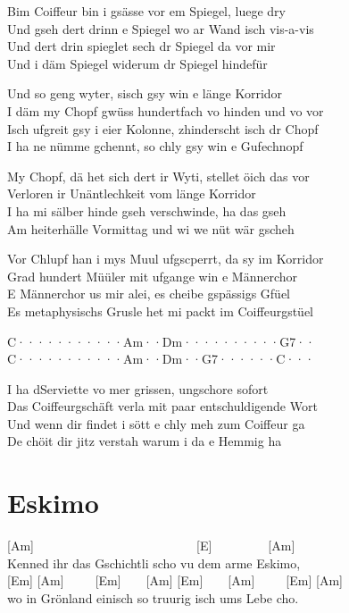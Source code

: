 \documentclass[
  letterpaper,
]{scrbook}
\begin{document}
Bim Coiffeur bin i gsässe vor em Spiegel, luege dry\\
Und gseh dert drinn e Spiegel wo ar Wand isch vis-a-vis\\
Und dert drin spieglet sech dr Spiegel da vor mir\\
Und i däm Spiegel widerum dr Spiegel hindefür

Und so geng wyter, s\textquotesingle isch gsy win e länge Korridor\\
I däm my Chopf gwüss hundertfach vo hinden und vo vor\\
Isch ufgreit gsy i eier Kolonne, z\textquotesingle hinderscht isch dr
Chopf\\
I ha ne nümme gchennt, so chly gsy win e Gufechnopf

My Chopf, dä het sich dert ir Wyti, stellet öich das vor\\
Verloren ir Unäntlechkeit vom länge Korridor\\
I ha mi sälber hinde gseh verschwinde, ha das gseh\\
Am heiterhälle Vormittag und wi we nüt wär gscheh

Vor Chlupf han i mys Muul ufgscperrt, da sy im Korridor\\
Grad hundert Müüler mit ufgange win e Männerchor\\
E Männerchor us mir alei, es cheibe gspässigs Gfüel\\
Es metaphysischs Grusle het mi packt im Coiffeurgstüel

\textbar C·······\textbar····Am··\textbar Dm······\textbar····G7··\textbar{}\\
\textbar C·······\textbar····Am··\textbar Dm··G7··\textbar····C···\textbar{}

I ha d\textquotesingle Serviette vo mer grissen, ungschore sofort\\
Das Coiffeurgschäft verla mit paar entschuldigende Wort\\
Und wenn dir findet i sött e chly meh zum Coiffeur ga\\
De chöit dir jitz verstah warum i da e Hemmig ha

\hypertarget{eskimo}{%
\chapter{Eskimo}\label{eskimo}}

{[}Am{]}~~~~~~~~~~~~~~~~~~~~~~~~~~{[}E{]}~~~~~~~~~{[}Am{]}\\
Kenned ihr das Gschichtli scho vu dem arme Eskimo,\\
{[}Em{]} {[}Am{]}~~~~~{[}Em{]}~~~~{[}Am{]}
{[}Em{]}~~~~{[}Am{]}~~~~~{[}Em{]} {[}Am{]}\\
wo in Grönland einisch so truurig isch ums Lebe cho.
\end{document}
